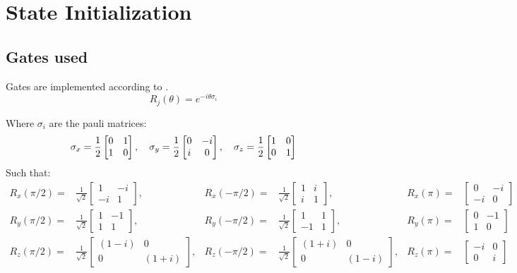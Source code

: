 \chapter{State Initialization}
\label{app:State Initialization}
\section{Gates used}
Gates are implemented according to \citet{Nielsen2010Quantum}.
\begin{equation}
    R_j(\theta)=e^{-i\theta \sigma_i}
\end{equation}

Where $\sigma_i$ are the pauli matrices:
\begin{equation}
\sigma_x=\frac{1}{2}\begin{bmatrix}0&1\\1&0\end{bmatrix}, \quad
\sigma_y=\frac{1}{2}\begin{bmatrix}0&-i\\i&0\end{bmatrix}\\,\quad
\sigma_z=\frac{1}{2}\begin{bmatrix}1&0\\0&1\end{bmatrix}
\end{equation}
Such that:
\begin{align*}
R_x(\pi/2)=&\frac{1}{\sqrt{2}}\begin{bmatrix}1&-i\\-i&1\end{bmatrix},
& R_x(-\pi/2)=&\frac{1}{\sqrt{2}}\begin{bmatrix}1&i\\i&1\end{bmatrix},
& R_x(\pi)=&\begin{bmatrix}0&-i\\-i&0\end{bmatrix}\\
%
R_y(\pi/2)=&\frac{1}{\sqrt{2}}\begin{bmatrix}1&-1\\1&1\end{bmatrix},
& R_y(-\pi/2)=&\frac{1}{\sqrt{2}}\begin{bmatrix}1&1\\-1&1\end{bmatrix},
& R_y(\pi)=&\begin{bmatrix}0&-1\\1&0\end{bmatrix}\\
%
R_z(\pi/2)=&\frac{1}{\sqrt{2}}\begin{bmatrix}(1-i)&0\\0&(1+i)\end{bmatrix},
& R_z(-\pi/2)=&\frac{1}{\sqrt{2}}\begin{bmatrix}(1+i)&0\\0&(1-i)\end{bmatrix},
& R_z(\pi)=&\begin{bmatrix}-i&0\\0&i\end{bmatrix}
\end{align*}

